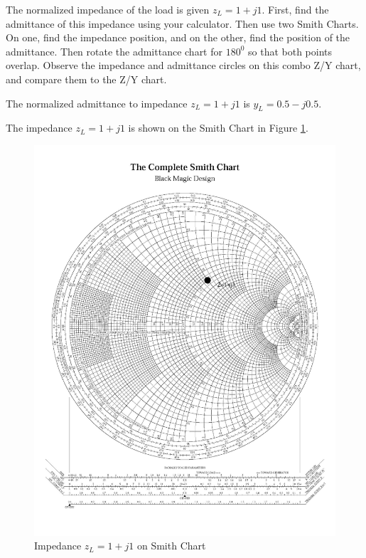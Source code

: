 \documentclass{ximera}
\begin{document}
\begin{example}
The normalized impedance of the load is given $z_L=1+j1$. First, find the admittance of this impedance using your calculator. Then use two Smith Charts. On one, find the impedance position, and on the other, find the position of the admittance. Then rotate the admittance chart for $180^0$ so that both points overlap. Observe the impedance and admittance circles on this combo Z/Y chart, and compare them to the Z/Y chart.

\begin{solution}
The normalized admittance to impedance  $z_L=1+j1$ is $y_L=0.5-j0.5$.

\end{solution}

The impedance $z_L=1+j1$ is shown on the Smith Chart in Figure \ref{fig:SC1-imp}.

\begin{figure}[htbp]
\begin{center}
\includegraphics[scale=0.1]{../jpg/Zchart-01-01.jpg}
\end{center}
\caption{Impedance $z_L=1+j1$ on Smith Chart} \label{fig:SC1-imp}
\end{figure}


\end{example}
\end{document}
